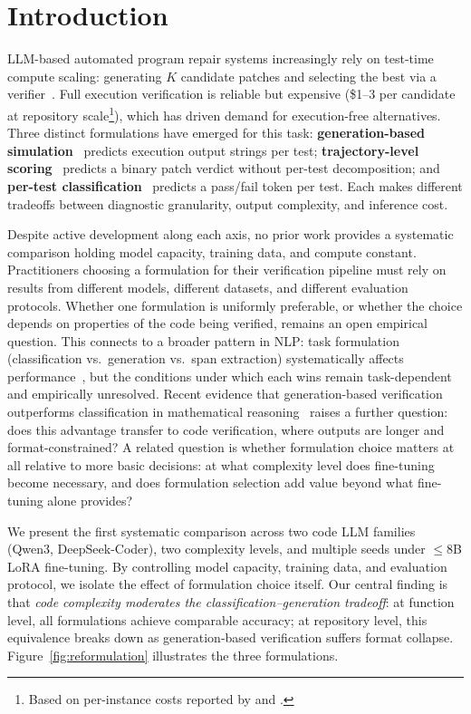 \section{Introduction}
\label{sec:introduction}

LLM-based automated program repair systems increasingly rely on test-time compute scaling: generating $K$ candidate patches and selecting the best via a verifier~\cite{snell2024scaling}. Full execution verification is reliable but expensive (\$1--3 per candidate at repository scale\footnote{Based on per-instance costs reported by \citet{yang2024sweagent} and \citet{xia2024agentless}.}), which has driven demand for execution-free alternatives. Three distinct formulations have emerged for this task: \textbf{generation-based simulation}~\cite{meta2025cwm,maimon2026selfexecution} predicts execution output strings per test; \textbf{trajectory-level scoring}~\cite{shum2025swerm} predicts a binary patch verdict without per-test decomposition; and \textbf{per-test classification}~\cite{ni2023lever,chen2023codet} predicts a pass/fail token per test. Each makes different tradeoffs between diagnostic granularity, output complexity, and inference cost.

Despite active development along each axis, no prior work provides a systematic comparison holding model capacity, training data, and compute constant. Practitioners choosing a formulation for their verification pipeline must rely on results from different models, different datasets, and different evaluation protocols. Whether one formulation is uniformly preferable, or whether the choice depends on properties of the code being verified, remains an open empirical question. This connects to a broader pattern in NLP: task formulation (classification vs.\ generation vs.\ span extraction) systematically affects performance~\cite{raffel2020t5}, but the conditions under which each wins remain task-dependent and empirically unresolved. Recent evidence that generation-based verification outperforms classification in mathematical reasoning~\cite{hosseini2025genrm} raises a further question: does this advantage transfer to code verification, where outputs are longer and format-constrained? A related question is whether formulation choice matters at all relative to more basic decisions: at what complexity level does fine-tuning become necessary, and does formulation selection add value beyond what fine-tuning alone provides?

We present the first systematic comparison across two code LLM families (Qwen3, DeepSeek-Coder), two complexity levels, and multiple seeds under ${\leq}$8B LoRA fine-tuning. By controlling model capacity, training data, and evaluation protocol, we isolate the effect of formulation choice itself. Our central finding is that \emph{code complexity moderates the classification--generation tradeoff}: at function level, all formulations achieve comparable accuracy; at repository level, this equivalence breaks down as generation-based verification suffers format collapse. Figure~\ref{fig:reformulation} illustrates the three formulations.

